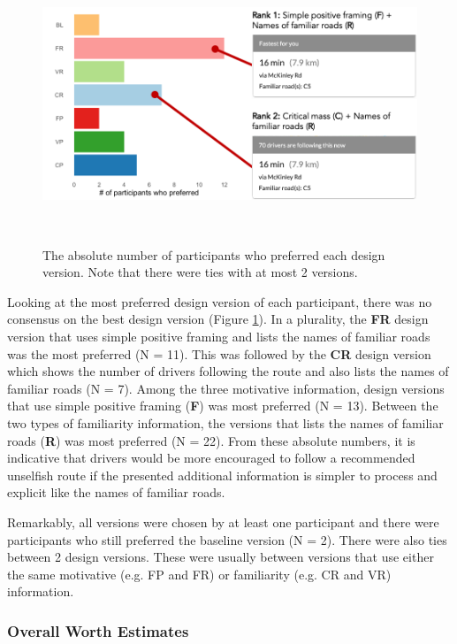 \begin{figure}[h]
\centering
  \includegraphics[scale=.8]{figures/s3-pc-winners.png}
  \caption{The absolute number of participants who preferred each design version. Note that there were ties with at most 2 versions.}~\label{fig:s3-pc-winners}
\end{figure}

Looking at the most preferred design version of each participant, there was no consensus on the best design version (Figure \ref{fig:s3-pc-winners}). In a plurality, the \textbf{FR} design version that uses simple positive framing and lists the names of familiar roads was the most preferred (N = 11). This was followed by the \textbf{CR} design version which shows the number of drivers following the route and also lists the names of familiar roads (N = 7). Among the three motivative information, design versions that use simple positive framing (\textbf{F}) was most preferred (N = 13). Between the two types of familiarity information, the versions that lists the names of familiar roads (\textbf{R}) was most preferred (N = 22). From these absolute numbers, it is indicative that drivers would be more encouraged to follow a recommended unselfish route if the presented additional information is simpler to process and explicit like the names of familiar roads. 

Remarkably, all versions were chosen by at least one participant and there were participants who still preferred the baseline version (N = 2). There were also ties between 2 design versions. These were usually between versions that use either the same motivative  (e.g. FP and FR) or familiarity (e.g. CR and VR) information. 

\subsubsection{Overall Worth Estimates}

